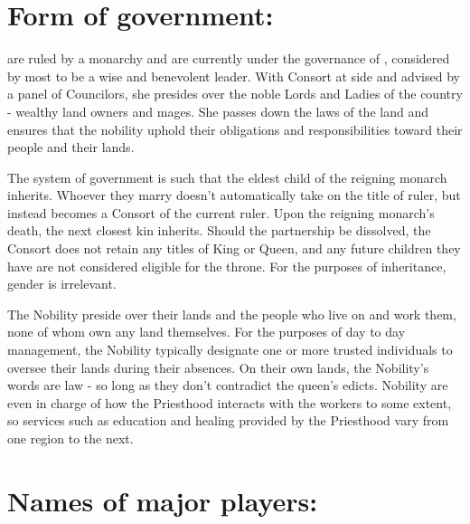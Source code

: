 \documentclass[blue]{GL2020}
\begin{document}
\name{\bAgrarians{}}



\section*{Form of government:}

\pFarm{} are ruled by a monarchy and are currently under the governance of \cQueen{}, considered by most to be a wise and benevolent leader.  With \cQueen{\they} Consort at \cQueen{\their} side and advised by a panel of Councilors, she presides over the noble Lords and Ladies of the country - wealthy land owners and mages.  She passes down the laws of the land and ensures that the nobility uphold their obligations and responsibilities toward their people and their lands.

The system of government is such that the eldest child of the reigning monarch inherits.  Whoever they marry doesn't automatically take on the title of ruler, but instead becomes a Consort of the current ruler.  Upon the reigning monarch's death, the next closest kin inherits.  Should the partnership be dissolved, the Consort does not retain any titles of King or Queen, and any future children they have are not considered eligible for the throne.  For the purposes of inheritance, gender is irrelevant.

The Nobility preside over their lands and the people who live on and work them, none of whom own any land themselves.  For the purposes of day to day management, the Nobility typically designate one or more trusted individuals to oversee their lands during their absences.  On their own lands, the Nobility's words are law - so long as they don't contradict the queen's edicts.  Nobility are even in charge of how the Priesthood interacts with the workers to some extent, so services such as education and healing provided by the Priesthood vary from one region to the next.


\section*{Names of major players:}
\end{document}
